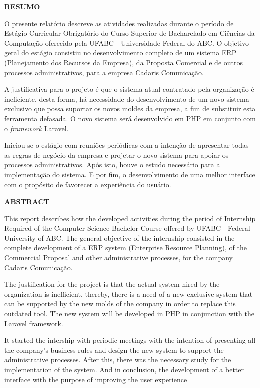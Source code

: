 \documentclass[
  12pt,				%
  openany,
  oneside,
  a4paper,			%
  english,			%
  brazil
]{article}
\numberwithin{figure}{section}
\numberwithin{table}{section}
\begin{document}
\begin{titlepage}

\begin{center}
  \textbf{RESUMO}
\end{center}

O presente relatório descreve as atividades realizadas durante o período de Estágio Curricular Obrigatório do Curso Superior de Bacharelado em Ciências da Computação oferecido pela UFABC - Universidade Federal do ABC. O objetivo geral do estágio consistiu no desenvolvimento completo de um sistema ERP (Planejamento dos Recursos da Empresa), da Proposta Comercial e de outros processos administrativos, para a empresa Cadaris Comunicação.

A justificativa para o projeto é que o sistema atual contratado pela organização é ineficiente, desta forma, há necessidade do desenvolvimento de um novo sistema exclusivo que possa suportar os novos moldes da empresa, a fim de substituir esta ferramenta defasada. O novo sistema será desenvolvido em PHP em conjunto com o \textit{framework} Laravel.

Iniciou-se o estágio com reuniões periódicas com a intenção de apresentar todas as regras de negócio da empresa e projetar o novo sistema para apoiar os processos administrativos. Após isto, houve o estudo necessário para a implementação do sistema. E por fim, o desenvolvimento de uma melhor interface com o propósito de favorecer a experiência do usuário.

\end{titlepage}


\begin{titlepage}

\begin{center}
  \textbf{ABSTRACT}
\end{center}

This report describes how the developed activities during the period of Internship Required of the Computer Science Bachelor Course offered by UFABC - Federal University of ABC. The general objective of the internship consisted in the complete development of a ERP system (Enterprise Resource Planning), of the Commercial Proposal and other administrative processes, for the company Cadaris Comunicação.

The justification for the project is that the actual system hired by the organization is inefficient, thereby, there is a need of a new exclusive system that can be supported by the new molds of the company in order to replace this outdated tool. The new system will be developed in PHP in conjunction with the Laravel framework.

It started the intership with periodic meetings with the intention of presenting all the company's business rules and design the new system to support the administrative processes. After this, there was the necessary study for the implementation of the system. And in conclusion, the development of a better interface with the purpose of improving the user experience

\end{titlepage}
\end{document}
